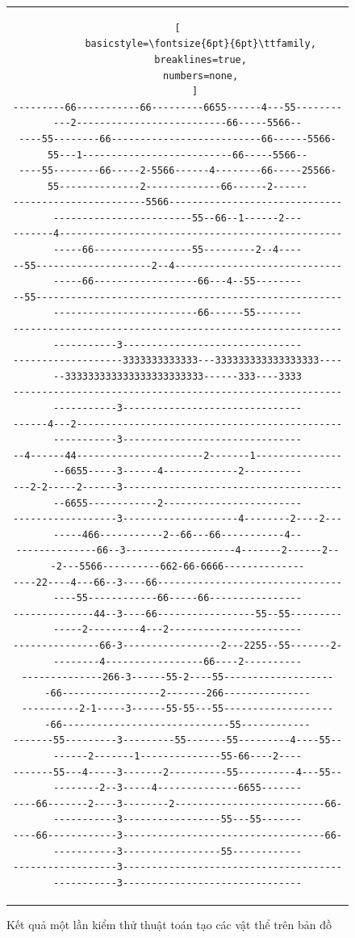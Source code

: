 \documentclass[12pt,a4paper]{article}
\begin{document}
\begin{figure}[H]
\begin{tabular}{c}
\begin{lstlisting}[
        basicstyle=\fontsize{6pt}{6pt}\ttfamily,
        breaklines=true,
        numbers=none,
      ]
---------66-----------66---------6655------4---55-----------2--------------------------66-----5566--
----55--------66--------------------------66------5566-55---1--------------------------66-----5566--
----55--------66-----2-5566------4--------66-----25566-55--------------2-------------66------2------
-----------------------5566------------------------------------------------------55--66--1------2---
-------4------------------------------------------------------66-----------------55---------2--4----
--55--------------------2--4----------------------------------66------------------66---4--55--------
--55------------------------------------------------------------------------------66------55--------
--------------------------------------------------------------------3-------------------------------
-------------------3333333333333---333333333333333333------333333333333333333333333------333----3333
--------------------------------------------------------------------3-------------------------------
------4---2---------------------------------------------------------3-------------------------------
--4------44----------------------2-------1-----------------6655-----3------4-------------2----------
---2-2-----2------3----------------------------------------6655------------2------------------------
------------------3--------------------4--------2----2--------466-----------2--66---66-----------4--
--------------66--3-------------------4-------2------2---2---5566----------662-66-6666--------------
----22----4---66--3----66------------------------------------55------------66-----66----------------
--------------44--3----66-----------------55--55--------------2---------4---2-----------------------
---------------66-3-----------------2---2255--55-------2---------4-----------------66----2----------
--------------266-3------55-2----55--------------------66-----------------2-------266---------------
----------2-1-----3------55-55---55--------------------66-----------------------------55------------
-------55---------3---------55-------55---------4----55--------2-------1--------------55-66----2----
-------55---4-----3-------2----------55----------4---55----------2--3-----4--------------6655-------
----66-------2----3--------2--------------------------66------------3-----------------55---55-------
----66------------3-----------------------------------66------------3-----------------55------------
------------------3-------------------------------------------------3-------------------------------
      \end{lstlisting}
    \end{tabular}
    \caption{Kết quả một lần kiểm thử thuật toán tạo các vật thể trên bản đồ}
    \label{test_gen_object}
  \end{figure}
\end{document}
